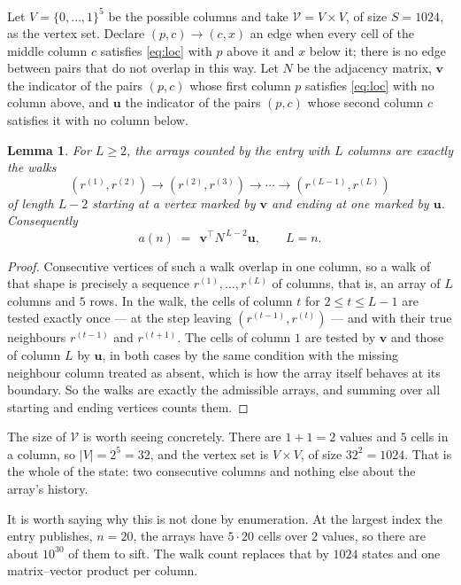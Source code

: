 \documentclass[11pt,a4paper]{article}
\theoremstyle{plain}
\newtheorem{lemma}[theorem]{Lemma}
\theoremstyle{definition}
\begin{document}
Let $V=\{0,\dots,1\}^{5}$ be the possible columns and take
$\mathcal V=V\times V$, of size $S=1024$, as the vertex set. Declare $(p,c)\to(c,x)$ an edge
when every cell of the middle column $c$ satisfies \eqref{eq:loc} with $p$ above it and $x$
below it; there is no edge between pairs that do not overlap in this way. Let $N$ be the
adjacency matrix, $\mathbf{v}$ the indicator of the pairs $(p,c)$ whose first column $p$
satisfies \eqref{eq:loc} with no column above, and $\mathbf{u}$ the indicator of
the pairs $(p,c)$ whose second column $c$ satisfies it with no column below.

\begin{lemma}\label{lem:walk}
For $L\ge2$, the arrays counted by the entry with $L$ columns are exactly the walks
\[
(r^{(1)},r^{(2)})\to(r^{(2)},r^{(3)})\to\cdots\to(r^{(L-1)},r^{(L)})
\]
of length $L-2$ starting at a vertex marked by $\mathbf{v}$ and ending at one marked by
$\mathbf{u}$. Consequently
\[
a(n)\;=\;\,\mathbf{v}^{\!\top}N^{\,L-2}\mathbf{u},\qquad L=n .
\]
\end{lemma}

\begin{proof}
Consecutive vertices of such a walk overlap in one column, so a walk of that shape is
precisely a sequence $r^{(1)},\dots,r^{(L)}$ of columns, that is, an array of $L$ columns
and $5$ rows. In the walk, the cells of column $t$ for $2\le t\le L-1$ are tested
exactly once --- at the step leaving $(r^{(t-1)},r^{(t)})$ --- and with their true
neighbours $r^{(t-1)}$ and $r^{(t+1)}$. The cells of column $1$ are tested by
$\mathbf{v}$ and those of column $L$ by $\mathbf{u}$, in both cases by the same condition
with the missing neighbour column treated as absent, which is how the array itself behaves at
its boundary. So the walks are exactly the admissible arrays, and summing over all starting
and ending vertices counts them.
\end{proof}


The size of $\mathcal V$ is worth seeing concretely. There are $1+1=2$ values
and $5$ cells in a column, so $|V|=2^{5}=32$, and the vertex set is
$V\times V$, of size $32^2=1024$. That is the whole of the state: two consecutive
columns and nothing else about the array's history.

It is worth saying why this is not done by enumeration. At the largest index the entry
publishes, $n=20$, the arrays have $5\cdot20$ cells over
$2$ values, so there are about $10^{30}$ of them to sift. The
walk count replaces that by $1024$ states and one matrix--vector product per column.
\end{document}
